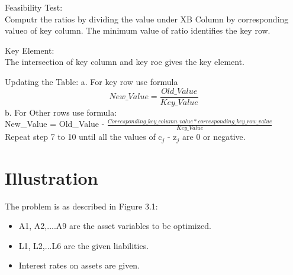 \begin{algorithm}[H]
\begin{algorithmic}[1]
\STATE Feasibility Test: \\
\tab Computr the ratios by dividing the value under XB Column by corresponding valueo of key column.  The minimum value of ratio identifies the key row. 

\STATE Key Element:\\
\tab The intersection of key column and key roe gives the key element.

\STATE Updating the Table:
\tab a. For key row use formula \begin{equation}
New\_Value = \frac{Old\_Value}{Key\_Value}
\end{equation}
\tab b. For Other rows use formula:\\

New\_Value = Old\_Value - $\frac{Corresponding\_key\_column\_value *  corresponding \_key\_row\_value}{Key\_Value}$ \\

\STATE Repeat step 7 to 10 until all the values of c$_{j}$ - z$_{j}$ are 0 or negative.

\end{algorithmic}

\end{algorithm}


\section{Illustration}

The problem is as described in Figure 3.1:
\begin{itemize}
\item A1, A2,....A9 are the asset variables to be optimized.

\item L1, L2,...L6 are the given liabilities.

\item Interest rates on assets are given.

\end{itemize}

